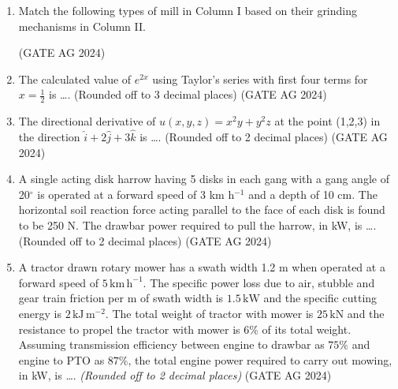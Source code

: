 \documentclass[journal]{IEEEtran}
\begin{document}
\begin{enumerate}
 \medskip

\item 
{Match the following types of mill in Column I based on their grinding mechanisms in Column II.}



\begin{enumerate}
\end{enumerate}
 \hfill(GATE AG 2024)\\

 \medskip

\item 
{The calculated value of \(e^{2x}\) using Taylor's series with first four terms for \(x = \frac{1}{2}\) is \dots. (Rounded off to 3 decimal places)}
 \hfill(GATE AG 2024)\\

 \medskip

\item 
{The directional derivative of \(u(x, y, z)=x^2y+y^2z\) at the point (1,2,3) in the direction \(\hat{i}+2\hat{j}+3\hat{k}\) is \dots. (Rounded off to 2 decimal places)}
 \hfill(GATE AG 2024)\\

 \medskip

\item 
{A single acting disk harrow having 5 disks in each gang with a gang angle of 20$^\circ$ is operated at a forward speed of 3 km h$^{-1}$ and a depth of 10 cm. The horizontal soil reaction force acting parallel to the face of each disk is found to be 250 N. The drawbar power required to pull the harrow, in kW, is \dots. (Rounded off to 2 decimal places)}
 \hfill(GATE AG 2024)\\

 \medskip

\item
A tractor drawn rotary mower has a swath width 1.2 m when operated at a forward speed of $5\, \text{km}\,\text{h}^{-1}$. The specific power loss due to air, stubble and gear train friction per m of swath width is $1.5\, \text{kW}$ and the specific cutting energy is $2\, \text{kJ}\,\text{m}^{-2}$. The total weight of tractor with mower is $25\, \text{kN}$ and the resistance to propel the tractor with mower is $6\%$ of its total weight. Assuming transmission efficiency between engine to drawbar as $75\%$ and engine to PTO as $87\%$, the total engine power required to carry out mowing, in kW, is \dots. \textit{(Rounded off to 2 decimal places)}
 \hfill(GATE AG 2024)\\


\end{enumerate}
\end{document}
